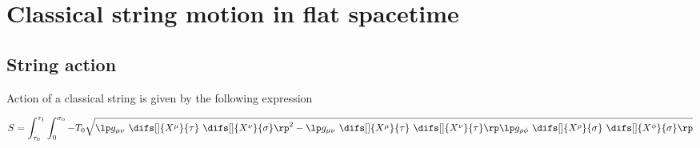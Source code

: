 \chapter{Classical string motion in flat spacetime}
\setcounter{page}{1}


\section{String action}

Action of a classical string is given by the following expression

\begin{equation}
S = \int_{\tau_0}^{\tau_1} \int_{0}^{\sigma_0} - T_0 \sqrt{ \lp g_{\mu \nu} ~ \difs[] {X^{\mu}} {\tau} ~ \difs[] {X^{\nu}} {\sigma} \rp^2 - \lp g_{\mu \nu} ~ \difs[] {X^{\mu}} {\tau} ~ \difs[] {X^{\nu}} {\tau} \rp \lp g_{\rho \phi} ~ \difs[] {X^{\rho}} {\sigma} ~ \difs[] {X^{\phi}} {\sigma} \rp}
\end{equation}